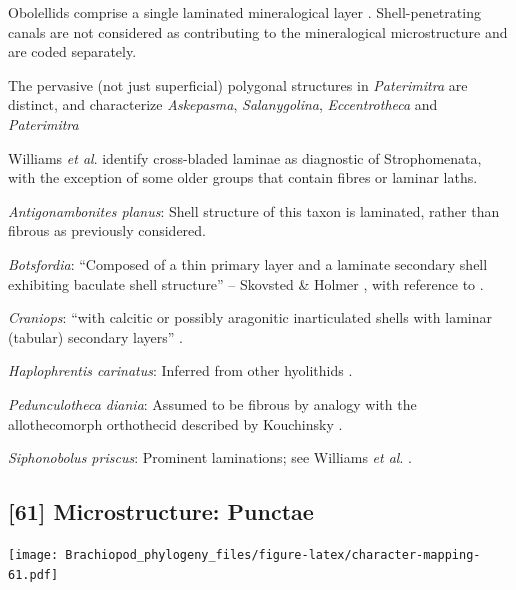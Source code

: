 \documentclass[openany]{book}
\theoremstyle{definition}
\theoremstyle{definition}
\theoremstyle{definition}
\theoremstyle{remark}
\begin{document}
Obolellids comprise a single laminated mineralogical layer
\citep{Balthasar2008iMummpikia}. Shell-penetrating canals are not
considered as contributing to the mineralogical microstructure and are
coded separately.

The pervasive (not just superficial) polygonal structures in
\emph{Paterimitra} are distinct, and characterize \emph{Askepasma},
\emph{Salanygolina}, \emph{Eccentrotheca} and \emph{Paterimitra}
\citep{Larsson2014iPaterimitra}

Williams \emph{et al}.
\citeyearpar{Williams2000LinguliformeaCraniiformea} identify
cross-bladed laminae as diagnostic of Strophomenata, with the exception
of some older groups that contain fibres or laminar laths.

\hypertarget{Antigonambonites_planus-coding-60}{}
\emph{Antigonambonites planus}: Shell structure of this taxon is
laminated, rather than fibrous as previously considered.

\hypertarget{Botsfordia-coding-60}{}
\emph{Botsfordia}: ``Composed of a thin primary layer and a laminate
secondary shell exhibiting baculate shell structure'' -- Skovsted \&
Holmer \citeyearpar{Skovsted2005EarlyCambrian}, with reference to
\citet{Skovsted2003EarlyCambrian}.

\hypertarget{Craniops-coding-60}{}
\emph{Craniops}: ``with calcitic or possibly aragonitic inarticulated
shells with laminar (tabular) secondary layers''
\citep{Williams2000LinguliformeaCraniiformea}.

\hypertarget{Haplophrentis_carinatus-coding-60}{}
\emph{Haplophrentis carinatus}: Inferred from other hyolithids
\citep[e.g.][]{Moore2018Plywoodlike}.

\hypertarget{Pedunculotheca_diania-coding-60}{}
\emph{Pedunculotheca diania}: Assumed to be fibrous by analogy with the
allothecomorph orthothecid described by Kouchinsky
\citeyearpar{Kouchinsky2000Skeletalmicrostructures}.

\hypertarget{Siphonobolus_priscus-coding-60}{}
\emph{Siphonobolus priscus}: Prominent laminations; see Williams
\emph{et al}. \citeyearpar{Williams2004Chemicostructure}.

\subsection*{{[}61{]} Microstructure:
Punctae}\label{microstructure-punctae}

\texttt{[image: Brachiopod\_phylogeny\_files/figure-latex/character-mapping-61.pdf]}
\end{document}
